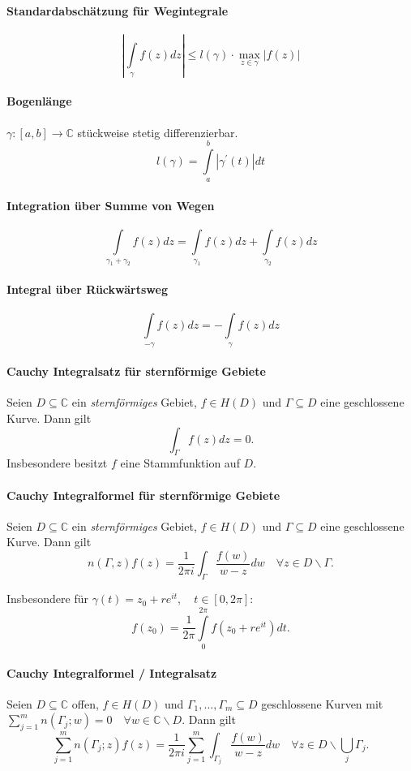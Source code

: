 \documentclass[a4paper, 10pt, DIV20, headings=small]{scrartcl}
\theoremstyle{definition}
\theoremstyle{plain}
\begin{document}
\paragraph{Standardabschätzung für Wegintegrale}
$$\left|\int\limits_{\gamma} f(z) dz \right| \leq l(\gamma) \cdot \max\limits_{z \in \gamma} |f(z)|$$

\paragraph{Bogenlänge}
$\gamma \colon [a,b] \rightarrow \mathbb{C}$ stückweise stetig differenzierbar.
$$l(\gamma) = \int\limits_a^b{|\gamma^\prime (t)| dt}$$

\paragraph{Integration über Summe von Wegen}
$$\int\limits_{\gamma_1 + \gamma_2}f(z) dz = \int\limits_{\gamma_1}f(z) dz + \int\limits_{\gamma_2}f(z) dz$$

\paragraph{Integral über Rückwärtsweg}
$$\int\limits_{-\gamma}f(z)dz = - \int \limits_{\gamma} f(z) dz$$

\paragraph{Cauchy Integralsatz für sternförmige Gebiete}
Seien $D \subseteq \mathbb{C}$ ein \emph{sternförmiges} Gebiet, $f \in H(D)$ und $\Gamma \subseteq D$ eine geschlossene Kurve. Dann gilt
$$\int_\Gamma f(z) dz = 0.$$ Insbesondere besitzt $f$ eine Stammfunktion auf $D$.

\paragraph{Cauchy Integralformel für sternförmige Gebiete}
Seien $D \subseteq \mathbb{C}$ ein \emph{sternförmiges} Gebiet, $f \in H(D)$ und $\Gamma \subseteq D$ eine geschlossene Kurve. Dann gilt
$$n(\Gamma,z)f(z) = \frac{1}{2 \pi i} \int_\Gamma \frac{f(w)}{w-z} dw \quad \forall z \in D \backslash \Gamma.$$

Insbesondere für $\gamma(t) = z_0 + r e^{it},\quad t \in [0,2\pi]$:
$$f(z_0) = \frac{1}{2 \pi} \int\limits_{0}^{2 \pi}f(z_0 + r e^{it}) dt.$$

\paragraph{Cauchy Integralformel / Integralsatz}
Seien $D \subseteq \mathbb{C}$ offen, $f \in H(D)$ und $\Gamma_1, \ldots, \Gamma_m \subseteq D$ geschlossene Kurven mit $\sum\limits_{j=1}^m{n(\Gamma_j;w)} = 0\quad \forall w \in \mathbb{C} \backslash D$. Dann gilt
$$\sum\limits_{j=1}^m {n(\Gamma_j;z)}f(z) = \frac{1}{2 \pi i} \sum\limits_{j=1}^m{ \int_{\Gamma_j} \frac{f(w)}{w-z} dw} \quad \forall z \in D \backslash \bigcup_j {\Gamma_j}.$$
\end{document}
